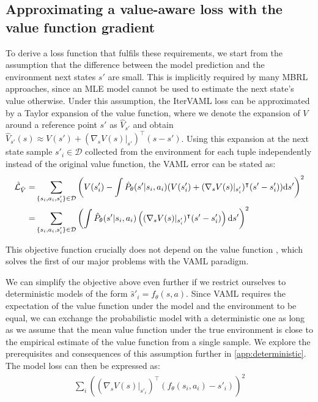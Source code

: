 \subsection{Approximating a value-aware loss with the value function gradient}
To derive a loss function that fulfils these requirements, we start from the assumption that the difference between the model prediction and the environment next states $s'$ are small.
This is implicitly required by many MBRL approaches, since an MLE model cannot be used to estimate the next state's value otherwise. 
Under this assumption, the IterVAML loss can be approximated by a Taylor expansion of the value function, where we denote the expansion of $V$ around a reference point $s'$ as $\hat{V}_{s'}$ and obtain $\hat{V}_{s'}(s) \approx V(s') + (\nabla_s V(s)|_{s'})^\intercal (s - s')$.
Using this expansion at the next state sample $s'_i \in \mathcal{D}$ collected from the environment for each tuple independently instead of the original value function, the VAML error can be stated as:
\begin{align}
    \hat{\mathcal{L}}_{\hat{V}}=&\sum_{\{s_i,a_i,s'_i\}\in\mathcal{D}}{\left(V(s'_i) - \int \hat{P}_\theta(s'|s_i,a_i) (V(s'_i) + (\nabla_s V(s)|_{s'_i})^\intercal (s' - s'_i)) \mathrm{d}s'\right)^2}\\
    =&\sum_{\{s_i,a_i,s'_i\}\in\mathcal{D}} {\left(\int \hat{P}_\theta(s'|s_i,a_i) \left((\nabla_s V(s)|_{s'_i})^\intercal(s' - s'_i) \right) \mathrm{d}s'\right)^2}
\end{align}

This objective function crucially does not depend on the value function , which solves the first of our major problems with the VAML paradigm.

We can simplify the objective above even further if we restrict ourselves to deterministic models of the form $\hat{s}'_i = f_\theta(s,a)$.
Since VAML requires the expectation of the value function under the model and the environment to be equal, we can exchange the probabilistic model with a deterministic one as long as we assume that the mean value function under the true environment is close to the empirical estimate of the value function from a single sample.
We explore the prerequisites and consequences of this assumption further in \autoref{app:deterministic}.
The model loss can then be expressed as:
\begin{align}
    \sum_i {\left((\nabla_s V(s)|_{s'_i})^\intercal (f_\theta(s_i,a_i) - s'_i) \right)^2} \label{eq:taylor_vaml}
\end{align}

